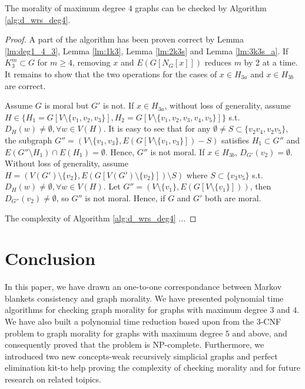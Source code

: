 \begin{theorem}
\label{thm:deg4}
The morality of maximum degree $4$ graphs can be checked by Algorithm \ref{alg:d_wrs_deg4}.
\end{theorem}
\begin{proof}
A part of the algorithm has been proven correct by Lemma \ref{lm:deg1_4_3}, Lemma \ref{lm:1k3}, Lemma \ref{lm:2k3s} and Lemma \ref{lm:3k3s_a}. If $K_3^m \subset G$ for $m \ge 4$, removing $x$ and $E(G[N_G[x]])$ reduces $m$ by 2 at a time. It remains to show that the two operations for the cases of $x \in H_{3a}$ and $x \in H_{3b}$ are correct. 

Assume $G$ is moral but $G'$ is not. If $x\in H_{3a}$, without loss of generality, assume $H \in \{H_1=G[V\setminus \{v_1,v_2,v_3\}], H_2=G[V\setminus \{v_1,v_2,v_3,v_4,v_5\}]\}$ s.t. $D_H(w) \neq \emptyset, \forall w \in V(H)$. It is easy to see that for any $\emptyset \neq S \subset \{v_2v_4,v_2v_5\}$, the subgraph $G''=(V \setminus \{v_1,v_3\},E(G[V \setminus \{v_1,v_3\}])-S)$ satisfies $H_1 \subset G''$ and $E(G''\setminus H_1) \cap E(H_1) = \emptyset$. Hence, $G''$ is not moral. If $x \in H_{3b}$, $D_{G'}(v_2)=\emptyset$. Without loss of generality, assume $H =(V(G')\setminus \{v_2\},E(G[V(G')\setminus \{v_2\}])\setminus S)$ where $S \subset \{v_3v_5\}$ s.t. $D_H(w) \neq \emptyset, \forall w \in V(H)$. Let $G''=(V\setminus \{v_1\}, E(G[V\setminus \{v_1\}]))$, then $D_{G''}(v_2)\neq \emptyset$, so $G''$ is not moral. Hence, if $G$ and $G'$ both are moral.

The complexity of Algorithm \ref{alg:d_wrs_deg4} ...

\end{proof}

\section{Conclusion}
In this paper, we have drawn an one-to-one correspondance between Markov blankets consistency and graph morality. We have presented polynomial time algorithms for checking graph morality for graphs with maximum degree $3$ and $4$. We have also built a polynomial time reduction based upon \cite{verma1993deciding} from the 3-CNF problem to graph morality for graphs with maximum degree $5$ and above, and consequently proved that the problem is NP-complete. Furthermore, we introduced two new concepts-weak recursively simplicial graphs and perfect elimination kit-to help proving the complexity of checking morality and for future research on related toipics. 


